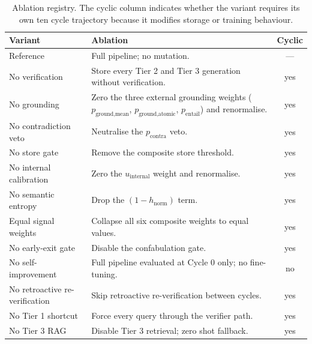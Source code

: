 \begin{table}[H]
\centering
\caption{Ablation registry. The cyclic column indicates whether the variant requires its own ten cycle trajectory because it modifies storage or training behaviour.}
\label{tab:ablation-registry}
\small
\begin{tabular}{@{}p{4.6cm}p{7.8cm}c@{}}
\toprule
\textbf{Variant} & \textbf{Ablation} & \textbf{Cyclic} \\
\midrule
Reference                          & Full pipeline; no mutation.                                             & ---  \\
No verification                    & Store every Tier 2 and Tier 3 generation without verification.          & yes  \\
No grounding                       & Zero the three external grounding weights ($p_{\text{ground,mean}}$, $p_{\text{ground,atomic}}$, $p_{\text{entail}}$) and renormalise.               & yes  \\
No contradiction veto              & Neutralise the $p_{\text{contra}}$ veto.                                & yes  \\
No store gate                      & Remove the composite store threshold.                                   & yes  \\
No internal calibration            & Zero the $u_{\text{internal}}$ weight and renormalise.                  & yes  \\
No semantic entropy                & Drop the $(1 - h_{\text{norm}})$ term.                                  & yes  \\
Equal signal weights               & Collapse all six composite weights to equal values.                     & yes  \\
No early-exit gate                 & Disable the confabulation gate.                                         & yes  \\
No self-improvement                & Full pipeline evaluated at Cycle 0 only; no fine-tuning.                & no   \\
No retroactive re-verification     & Skip retroactive re-verification between cycles.                        & yes  \\
No Tier 1 shortcut                 & Force every query through the verifier path.                            & yes  \\
No Tier 3 RAG                      & Disable Tier 3 retrieval; zero shot fallback.                           & yes  \\

\end{tabular}
\end{table}
